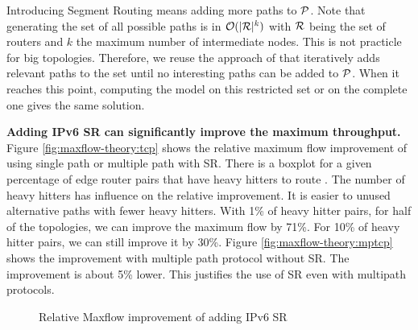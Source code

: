 Introducing Segment Routing means adding more paths to $\P$.
Note that generating the set of all possible paths is in $\O(|\R|^k)$
with $\R$ being the set of routers and $k$ the maximum number of intermediate nodes.
This is not practicle for big topologies.
Therefore, we reuse the approach of \cite{cg4sr} that iteratively adds relevant paths to the set
until no interesting paths can be added to $\P$.
When it reaches this point, computing the model on this restricted set or on the complete one
gives the same solution.

\textbf{Adding IPv6 SR can significantly improve the maximum throughput.}
Figure \ref{fig:maxflow-theory:tcp} shows the relative maximum flow improvement
of using single path or multiple path with SR.
There is a boxplot for a given percentage of edge router pairs that have heavy hitters
to route .
The number of heavy hitters has influence on the relative improvement.
It is easier to unused alternative paths with fewer heavy hitters.
With 1\% of heavy hitter pairs, for half of the topologies,
we can improve the maximum flow by 71\%.
For 10\% of heavy hitter pairs, we can still improve it by 30\%.
Figure \ref{fig:maxflow-theory:mptcp} shows the improvement with multiple path protocol
without SR.
The improvement is about 5\% lower. This justifies the use of SR even with multipath protocols.

\begin{figure}
	\centering
	\caption{Relative Maxflow improvement of adding IPv6 SR}
	\label{fig:maxflow-theory}
\end{figure}

